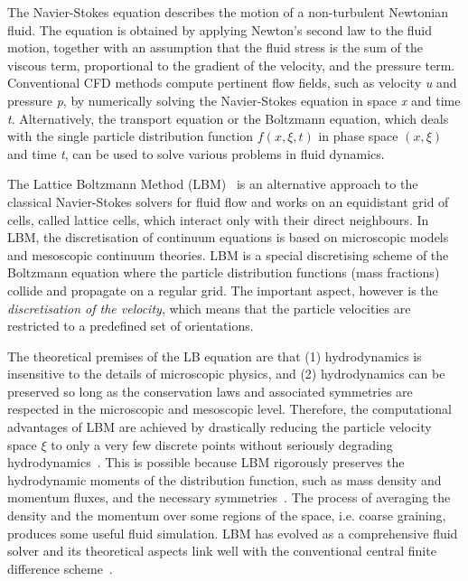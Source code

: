 The Navier-Stokes equation describes the motion of a 
non-turbulent Newtonian fluid. The equation is obtained by 
applying Newton's second law to the fluid motion, together with 
an assumption that the fluid stress is the sum of the 
viscous term, proportional to the gradient of the velocity, and 
the pressure term. Conventional CFD methods compute 
pertinent flow fields, such as velocity \textit{u} and pressure 
\textit{p}, by numerically solving the Navier-Stokes equation 
in space \textit{x} and time \textit{t}. Alternatively, the 
transport equation or the Boltzmann equation, which deals with 
the single particle distribution function $f(x,\xi,t)$ in 
phase space $(x,\xi)$ and time \textit{t}, can be used to solve 
various problems in fluid dynamics. 

The Lattice Boltzmann Method
(LBM)~\citep{He1997a,He1997b,Chen1998a,Mei2000,Han2007a,Zhou2012}
is an alternative approach to the classical Navier-Stokes
solvers for fluid flow and works on an equidistant grid of 
cells, called lattice cells, which interact only with their 
direct neighbours. In LBM, the discretisation of continuum 
equations is based on microscopic models and mesoscopic 
continuum theories. LBM is a special discretising scheme of the 
Boltzmann equation where the particle distribution functions 
(mass fractions) collide and propagate on a regular grid. The 
important aspect, however is the \textit{discretisation of the 
velocity}, which means that the particle velocities are 
restricted to a predefined set of orientations.

The theoretical premises of the LB equation are that (1) 
hydrodynamics is insensitive to the details of microscopic 
physics, and (2) hydrodynamics can be preserved so long as the 
conservation laws and associated symmetries are respected in 
the microscopic and mesoscopic level. Therefore, the 
computational advantages of LBM are achieved by drastically 
reducing the particle velocity space $\xi$ to only a very few 
discrete points without seriously degrading 
hydrodynamics~\citep{Mei2000}. This is possible 
because LBM rigorously preserves the hydrodynamic moments of 
the distribution function, such as mass density and momentum 
fluxes, and the necessary symmetries~\citep{He1997a,He1997b}. 
The process of averaging the density and the momentum over some 
regions of the space, i.e. coarse graining, produces some 
useful fluid simulation. LBM has evolved as a comprehensive 
fluid solver and its theoretical aspects link well with the 
conventional central finite difference scheme~\citep{Cook2004}.

